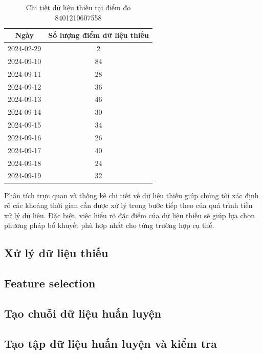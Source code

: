 \begin{table}[htbp]
\centering
{}
\caption{Tóm tắt dữ liệu thiếu tại điểm đo 841211914190}
\label{tab:missing_data_841211914190}
\end{table}

\begin{table}[htbp]
\centering
\begin{tabular}{|c|c|}
\hline
\textbf{Ngày} & \textbf{Số lượng điểm dữ liệu thiếu} \\
\hline
2024-02-29 & 2 \\
\hline
2024-09-10 & 84 \\
\hline
2024-09-11 & 28 \\
\hline
2024-09-12 & 36 \\
\hline
2024-09-13 & 46 \\
\hline
2024-09-14 & 30 \\
\hline
2024-09-15 & 34 \\
\hline
2024-09-16 & 26 \\
\hline
2024-09-17 & 40 \\
\hline
2024-09-18 & 24 \\
\hline
2024-09-19 & 32 \\
\hline
\end{tabular}
\caption{Chi tiết dữ liệu thiếu tại điểm đo 8401210607558}
\label{tab:missing_data_8401210607558}
\end{table}

Phân tích trực quan và thống kê chi tiết về dữ liệu thiếu giúp chúng tôi xác định rõ các khoảng thời gian cần được xử lý trong bước tiếp theo của quá trình tiền xử lý dữ liệu. Đặc biệt, việc hiểu rõ đặc điểm của dữ liệu thiếu sẽ giúp lựa chọn phương pháp bổ khuyết phù hợp nhất cho từng trường hợp cụ thể.

\subsection{Xử lý dữ liệu thiếu}
\subsection{Feature selection}
\subsection{Tạo chuỗi dữ liệu huấn luyện}
\subsection{Tạo tập dữ liệu huấn luyện và kiểm tra}
